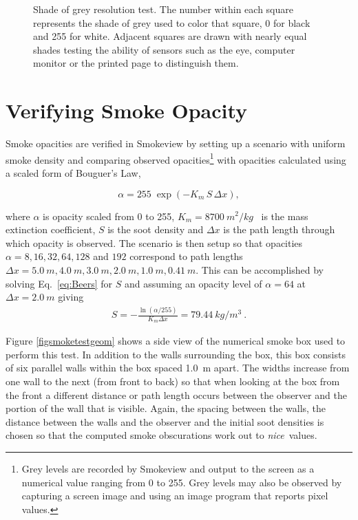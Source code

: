 \documentclass[11pt,twoside]{book}
\begin{document}
\begin{figure}[bph]
\begin{center}
\begin{tabular}{c}
 \end{tabular}
\end{center}
 \caption[Shade of grey resolution test.]{Shade of grey resolution test.
 The number within each square represents the shade of grey used to color
 that square,  0 for black and 255 for white.  Adjacent squares are drawn
 with nearly equal shades  testing the ability of sensors such as the eye,
 computer monitor or the printed page  to distinguish them.
 }
\label{figgraysquare}%
\end{figure}

\section{Verifying Smoke Opacity}
\label{sect:verify_smoke}

Smoke opacities are verified in Smokeview by setting up a scenario with uniform smoke density and
comparing observed opacities\footnote{Grey levels are recorded by Smokeview and output to the screen as a numerical value ranging from 0 to 255.
Grey levels may also be observed by capturing a screen image and using an image program that reports pixel values.}
with opacities calculated using a scaled form of Bouguer's Law,

\begin{equation}
\alpha = 255 \; \exp(-K_m \, S \, \Delta x),
\label{eq:Beers}
\end{equation}

\noindent where $\alpha$ is opacity scaled from 0 to 255, $K_m=\SI{8700}{m^2/kg}$~\cite{Mulholland:F+M} is the mass extinction coefficient, $S$ is the soot density and $\Delta x$ is the path length through which opacity is observed. The scenario is then setup so that opacities $\alpha=8, 16, 32, 64, 128$ and $192$ correspond to path lengths $\Delta x = \SI{5.0}{m}, \SI{4.0}{m}, \SI{3.0}{m}, \SI{2.0}{m}, \SI{1.0}{m} , \SI{0.41}{m}$.
This can be accomplished by solving Eq.~\ref{eq:Beers} for $S$ and assuming an opacity level of $\alpha=64$ at $\Delta x=\SI{2.0}{m}$ giving
\begin{eqnarray*}
S=-\frac{\ln(\alpha/255)}{K_m\Delta x} =\SI{79.44}{kg/m^3}~.
\end{eqnarray*}

Figure \ref{figsmoketestgeom} shows a side view of the numerical smoke box used to
perform this test.  In addition to the walls surrounding the box, this box consists
of  six parallel walls within the box spaced 1.0~m apart.  The widths increase from
one wall to the next (from front to back) so that when looking at the box from the
front a different distance or path length occurs between the observer and the portion
of the wall that is visible. Again, the spacing between the walls, the distance between
the walls and the observer and the initial soot densities is chosen so that the computed
smoke obscurations work out to {\em nice}\ values.
\end{document}
